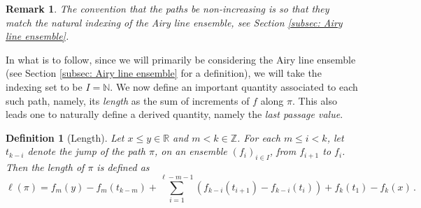 \documentclass[11pt, reqno]{amsart}
\numberwithin{equation}{section}
\newcounter{dummy} \numberwithin{dummy}{section}
\newtheorem{definition}[dummy]{Definition}
\newtheorem*{remark}{Remark}
\begin{document}
\begin{remark}
    The convention that the paths be non-increasing is so that they match the natural indexing of the Airy line ensemble, see Section \ref{subsec: Airy line ensemble}. 
\end{remark}

In what is to follow, since we will primarily be considering the Airy line ensemble (see Section \ref{subsec: Airy line ensemble} for a definition), we will take the indexing set to be \(I = \mathbb{N}\). We now define an important quantity associated to each such path, namely, its \emph{length} as the sum of increments of \(f\) along \(\pi\). This also leads one to naturally define a derived quantity, namely the \emph{last passage value}.

\begin{definition}[Length]\label{def: length} Let \(x\leq y \in \mathbb{R}\) and \(m < k\in\mathbb{Z}\). For each \(m\leq i <k\), let \(t_{k-i}\) denote the jump of the path \(\pi\), on an ensemble \((f_i)_{i\in I}\), from \(f_{i+1}\) to \(f_{i}\). Then the length of \(\pi\) is defined as
\begin{equation*}
\ell(\pi) = f_m(y)-f_m(t_{k-m}) + \displaystyle\sum_{i = 1}^{\ell-m-1}(f_{k-i}(t_{i+1})-f_{k-i}(t_{i}))+f_{k}(t_{1})-f_{k}(x)\,.
\end{equation*}
\end{definition}%
\end{document}
